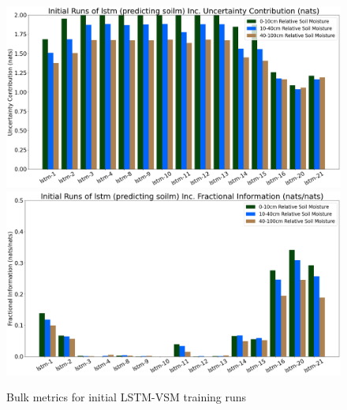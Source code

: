 \begin{figure}[hp!]
    \includegraphics[width=.48\linewidth,draft=false]{figures/efficiency_initial-best/eval_test_efficiency_initial-lstm-soilm_info-loss_res.png}
    \includegraphics[width=.48\linewidth,draft=false]{figures/efficiency_initial-best/eval_test_efficiency_initial-lstm-soilm_fi_res.png}

    \caption{Bulk metrics for initial LSTM-VSM training runs}
    \label{model-init-fnn}
\end{figure}

